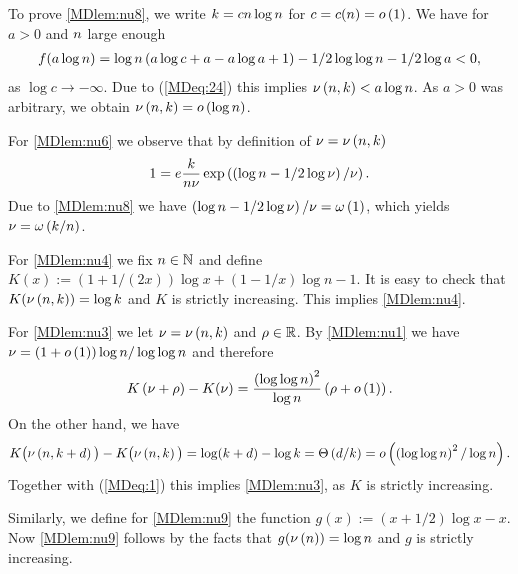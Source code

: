 To prove \ref{MDlem:nu8}, we write $k=cn\log n$ for $c=c(n)=o\left(1\right)$. We have for $a>0$ and $n$ large enough
\begin{align*}
	f(a\log n)=\log n\left(a\log c+a-a\log a+1\right)-1/2\log \log n-1/2\log a<0,
\end{align*}
as $\log c\to -\infty$. Due to (\ref{MDeq:24}) this implies $\nu\left(n, k\right)<a\log n$. As $a>0$ was arbitrary, we obtain $\nu\left(n, k\right)=o\left(\log n\right)$. 

For \ref{MDlem:nu6} we observe that by definition of $\nu=\nu\left(n, k\right)$
\begin{align*}
	1=e\frac{k}{n\nu}\exp\left(\left(\log n-1/2\log \nu\right)/\nu\right).
\end{align*}
Due to \ref{MDlem:nu8} we have $\left(\log n-1/2\log \nu\right)/\nu=\omega\left(1\right)$, which yields $\nu=\omega\left(k/n\right)$.

For \ref{MDlem:nu4} we fix $n\in \mathbb{N}$ and define $K(x):=\left(1+1/(2x)\right)\log x+\left(1-1/x\right)\log n-1$. It is easy to check that $K(\nu\left(n, k\right))=\log k$ and $K$ is strictly increasing. This implies \ref{MDlem:nu4}.

For \ref{MDlem:nu3} we let $\nu=\nu\left(n, k\right)$ and $\rho\in\mathbb{R}$. By \ref{MDlem:nu1} we have $\nu=\left(1+o\left(1\right)\right)\log n/\log\log n$ and therefore
\begin{align}\label{MDeq:1}
	K\left(\nu+\rho\right)-K(\nu)=\frac{\left(\log\log n\right)^2}{\log n}\left(\rho +o\left(1\right)\right).
\end{align}
On the other hand, we have 
\begin{align*}
	K\big(\nu\left(n, k+d\right)\big)-K\big(\nu\left(n, k\right)\big)=\log (k+d)-\log k=\Theta\left(d/k\right)=o\left(\left(\log \log n\right)^2/\log n\right).
\end{align*}
Together with (\ref{MDeq:1}) this implies \ref{MDlem:nu3}, as $K$ is strictly increasing.

Similarly, we define for \ref{MDlem:nu9} the function $g(x):=\left(x+1/2\right)\log x-x$. Now \ref{MDlem:nu9} follows by the facts that $g(\nu\left(n\right))=\log n$ and $g$ is strictly increasing. 

